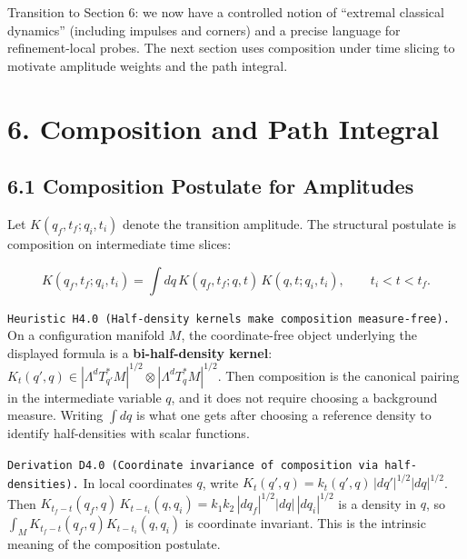 \documentclass[
]{article}
\begin{document}
Transition to Section 6: we now have a controlled notion of ``extremal
classical dynamics'' (including impulses and corners) and a precise
language for refinement-local probes. The next section uses composition
under time slicing to motivate amplitude weights and the path integral.

\hypertarget{composition-and-path-integral}{%
\section{6. Composition and Path
Integral}\label{composition-and-path-integral}}

\hypertarget{composition-postulate-for-amplitudes}{%
\subsection{6.1 Composition Postulate for
Amplitudes}\label{composition-postulate-for-amplitudes}}

Let \(K(q_f,t_f;q_i,t_i)\) denote the transition amplitude. The
structural postulate is composition on intermediate time slices:

\[
K(q_f,t_f;q_i,t_i)
=\int dq\,K(q_f,t_f;q,t)\,K(q,t;q_i,t_i),
\qquad t_i<t<t_f.
\]

\texttt{Heuristic\ H4.0\ (Half-density\ kernels\ make\ composition\ measure-free).}
On a configuration manifold \(M\), the coordinate-free object underlying
the displayed formula is a \textbf{bi-half-density kernel}:
\(K_t(q',q)\in|\Lambda^dT^\ast_{q'}M|^{1/2}\otimes|\Lambda^dT^\ast_qM|^{1/2}\).
Then composition is the canonical pairing in the intermediate variable
\(q\), and it does not require choosing a background measure. Writing
\(\int dq\) is what one gets after choosing a reference density to
identify half-densities with scalar functions.

\texttt{Derivation\ D4.0\ (Coordinate\ invariance\ of\ composition\ via\ half-densities).}
In local coordinates \(q\), write
\(K_t(q',q)=k_t(q',q)\,|dq'|^{1/2}|dq|^{1/2}\). Then
\(K_{t_f-t}(q_f,q)\,K_{t-t_i}(q,q_i) =k_1k_2\,|dq_f|^{1/2}|dq|\,|dq_i|^{1/2}\)
is a density in \(q\), so \(\int_M K_{t_f-t}(q_f,q)K_{t-t_i}(q,q_i)\) is
coordinate invariant. This is the intrinsic meaning of the composition
postulate.
\end{document}
